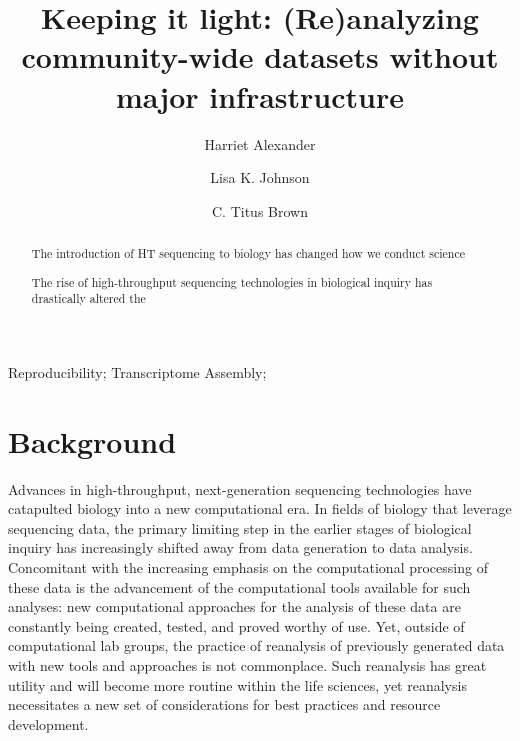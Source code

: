 \documentclass[a4paper,num-refs]{oup-contemporary}
\title{Keeping it light: (Re)analyzing community-wide datasets without major infrastructure}
\author[1]{Harriet Alexander}
\author[1]{Lisa K. Johnson}
\author[1,\authfn{1}]{C. Titus Brown}
\affil[1]{Population Health and Reproduction, University of California, Davis, CA, USA}
\begin{document}
\begin{frontmatter}
\maketitle

  \begin{abstract}
The introduction of HT sequencing to biology has changed how we conduct science

The rise of high-throughput sequencing technologies in biological inquiry has drastically altered the
  \end{abstract}

\begin{keywords}
Reproducibility; Transcriptome Assembly;
\end{keywords}
\end{frontmatter}

\section{Background}
Advances in high-throughput, next-generation sequencing technologies have catapulted biology into a new computational era. In fields of biology that leverage sequencing data, the primary limiting step in the earlier stages of biological inquiry has increasingly shifted away from data generation to data analysis. Concomitant with the increasing emphasis on the computational processing of these data is the advancement of the computational tools available for such analyses: new computational approaches for the analysis of these data are constantly being created, tested, and proved worthy of use. Yet, outside of computational lab groups, the practice of reanalysis of previously generated data with new tools and approaches is not commonplace. Such reanalysis has great utility and will become more routine within the life sciences, yet reanalysis necessitates a new set of considerations for best practices and resource development.


\end{document}
